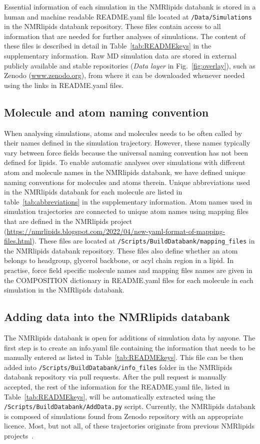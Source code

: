 \documentclass[fleqn,10pt]{wlscirep}
\begin{document}
Essential information of each simulation in the NMRlipids databank is stored in a human and machine readable README.yaml file located at \texttt{/Data/Simulations} in the NMRlipids databank repository. These files contain access to all information that are needed for further analyses of simulations. The content of these files is described in detail in Table~\ref{tab:READMEkeys} in the supplementary information. Raw MD simulation data are stored in external publicly available and stable repositories (\textit{Data layer} in Fig.~\ref{fig:overlay}), such as Zenodo (\url{www.zenodo.org}), from where it can be downloaded whenever needed using the links in README.yaml files.  


\subsection{Molecule and atom naming convention} \label{naming}
When analysing simulations, atoms and molecules needs to be often called by their names defined in the simulation trajectory. However, these names typically vary between force fields because the universal naming convention has not been defined for lipids. To enable automatic analyses over simulations with different atom and molecule names in the NMRlipids databank, we have defined unique naming conventions for molecules and atoms therein. Unique abbreviations used in the NMRlipids databank for each molecule are listed in table~\ref{tab:abbreviations} in the supplementary information. Atom names used in simulation trajectories are connected to unique atom names using mapping files that are defined in the NMRlipids project (\url{https://nmrlipids.blogspot.com/2022/04/new-yaml-format-of-mapping-files.html}). These files are located at \texttt{/Scripts/BuildDatabank/mapping\_files} in the NMRlipids databank repository. These files also define whether an atom belongs to headgroup, glycerol backbone, or acyl chain region in a lipid. In practise, force field specific molecule names and mapping files
names are given in the COMPOSITION dictionary in README.yaml files for each molecule in each simulation in the NMRlipids databank.

\subsection{Adding data into the NMRlipids databank}
The NMRlipids databank is open for additions of simulation data by anyone. The first step is to create an info.yaml file containing the information that needs to be manually entered as listed in Table~\ref{tab:READMEkeys}. This file can be then added into \texttt{/Scripts/BuildDatabank/info\_files} folder in the NMRlipids databank repository via pull requests. After the pull request is manually accepted, the rest of the information for the README.yaml file, listed in Table~\ref{tab:READMEkeys}, will be automatically extracted using the \texttt{/Scripts/BuildDatabank/AddData.py} script. Currently, the NMRlipids databank is composed of simulations found from Zenodo repository with an appropriate licence. Most, but not all, of these trajectories originate from previous NMRlipids projects~\cite{botan15,catte16,antila19,bacle21}.
\end{document}

